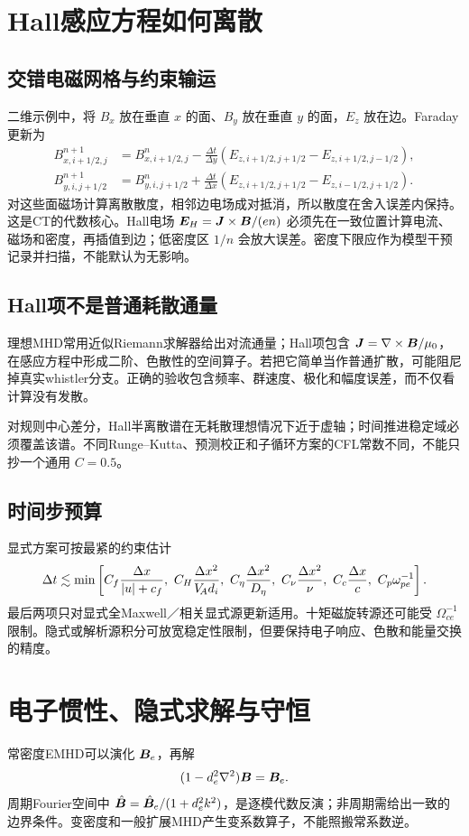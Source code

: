 \documentclass[UTF8,a4paper,11pt,openany,fontset=fandol]{ctexbook}
\begin{document}
\section{Hall感应方程如何离散}
\subsection{交错电磁网格与约束输运}
二维示例中，将 $B_x$ 放在垂直 $x$ 的面、$B_y$ 放在垂直 $y$ 的面，$E_z$ 放在边。Faraday更新为
\begin{align}
B_{x,i+1/2,j}^{n+1}&=B_{x,i+1/2,j}^n-\frac{\Delta t}{\Delta y}(E_{z,i+1/2,j+1/2}-E_{z,i+1/2,j-1/2}),\\
B_{y,i,j+1/2}^{n+1}&=B_{y,i,j+1/2}^n+\frac{\Delta t}{\Delta x}(E_{z,i+1/2,j+1/2}-E_{z,i-1/2,j+1/2}).
\end{align}
对这些面磁场计算离散散度，相邻边电场成对抵消，所以散度在舍入误差内保持。这是CT的代数核心。Hall电场 $\bm{E}_H=\bm{J}\times\bm{B}/(en)$ 必须先在一致位置计算电流、磁场和密度，再插值到边；低密度区 $1/n$ 会放大误差。密度下限应作为模型干预记录并扫描，不能默认为无影响。

\subsection{Hall项不是普通耗散通量}
理想MHD常用近似Riemann求解器给出对流通量；Hall项包含 $\bm{J}=\nabla\times\bm{B}/\mu_0$，在感应方程中形成二阶、色散性的空间算子。若把它简单当作普通扩散，可能阻尼掉真实whistler分支。正确的验收包含频率、群速度、极化和幅度误差，而不仅看计算没有发散。

对规则中心差分，Hall半离散谱在无耗散理想情况下近于虚轴；时间推进稳定域必须覆盖该谱。不同Runge--Kutta、预测校正和子循环方案的CFL常数不同，不能只抄一个通用 $C=0.5$。

\subsection{时间步预算}
显式方案可按最紧的约束估计
\begin{equation}\Delta t\lesssim\min\left[C_f{\Delta x\over |u|+c_f},\ C_H{\Delta x^2\over \VA d_i},\ C_\eta{\Delta x^2\over D_\eta},\ C_\nu{\Delta x^2\over\nu},\ C_c{\Delta x\over c},\ C_p\omega_{pe}^{-1}\right].
\end{equation}
最后两项只对显式全Maxwell／相关显式源更新适用。十矩磁旋转源还可能受 $\Omega_{ce}^{-1}$ 限制。隐式或解析源积分可放宽稳定性限制，但要保持电子响应、色散和能量交换的精度。

\section{电子惯性、隐式求解与守恒}
常密度EMHD可以演化 $\bm{B}_e$，再解
\begin{equation}(1-d_e^2\nabla^2)\bm{B}=\bm{B}_e.
\end{equation}
周期Fourier空间中 $\hat{\bm{B}}=\hat{\bm{B}}_e/(1+d_e^2k^2)$，是逐模代数反演；非周期需给出一致的边界条件。变密度和一般扩展MHD产生变系数算子，不能照搬常系数逆。
\end{document}
